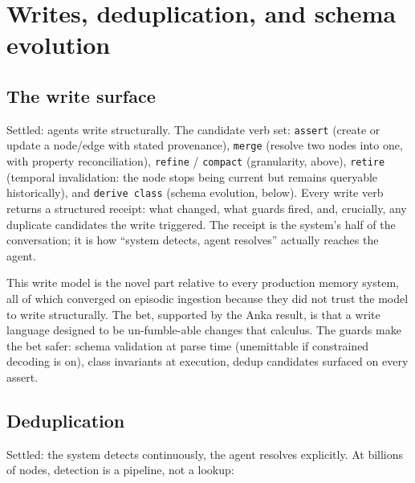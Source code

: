\documentclass[11pt]{article}
\begin{document}
\section{Writes, deduplication, and schema evolution}

\subsection{The write surface}

Settled: agents write structurally. The candidate verb set: \texttt{assert} (create or update a node/edge with stated provenance), \texttt{merge} (resolve two nodes into one, with property reconciliation), \texttt{refine} / \texttt{compact} (granularity, above), \texttt{retire} (temporal invalidation: the node stops being current but remains queryable historically), and \texttt{derive class} (schema evolution, below). Every write verb returns a structured receipt: what changed, what guards fired, and, crucially, any duplicate candidates the write triggered. The receipt is the system's half of the conversation; it is how ``system detects, agent resolves'' actually reaches the agent.

This write model is the novel part relative to every production memory system, all of which converged on episodic ingestion because they did not trust the model to write structurally. The bet, supported by the Anka result, is that a write language designed to be un-fumble-able changes that calculus. The guards make the bet safer: schema validation at parse time (unemittable if constrained decoding is on), class invariants at execution, dedup candidates surfaced on every assert.

\subsection{Deduplication}

Settled: the system detects continuously, the agent resolves explicitly. At billions of nodes, detection is a pipeline, not a lookup:
\end{document}
